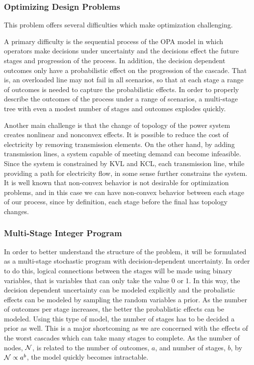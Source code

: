 \documentclass[class=report]{standalone}
\begin{document}
\subsubsection{Optimizing Design Problems}
This problem offers several difficulties which make optimization challenging.  

A primary difficulty is the sequential process of the OPA model in which operators make decisions under uncertainty and the decisions effect the future stages and progression of the process.  In addition, the decision dependent outcomes only have a probabilistic effect on the progression of the cascade.  That is, an overloaded line may not fail in all scenarios, so that at each stage a range of outcomes is needed to capture the probabilistic effects.  In order to properly describe the outcomes of the process under a range of scenarios, a multi-stage tree with even a modest number of stages and outcomes explodes quickly.

Another main challenge is that the change of topology of the power system creates nonlinear and nonconvex effects.  It is possible to reduce the cost of electricity by removing transmission elements.  On the other hand, by adding transmission lines, a system capable of meeting demand can become infeasible.  Since the system is constrained by KVL and KCL, each transmission line, while providing a path for electricity flow, in some sense further constrains the system.  It is well known that non-convex behavior is not desirable for optimization problems, and in this case we can have non-convex behavior between each stage of our process, since by definition, each stage before the final has topology changes.

\subsubsection{Multi-Stage Integer Program}
In order to better understand the structure of the problem, it will be formulated as a multi-stage stochastic program with decision-dependent uncertainty.  In order to do this, logical connections between the stages will be made using binary variables, that is variables that can only take the value 0 or 1.  In this way, the decision dependent uncertainty can be modeled explicitly and the probalistic effects can be modeled by sampling the random variables a prior.  As the number of outcomes per stage increases, the better the probablistic effects can be modeled.  Using this type of model, the number of stages has to be decided a prior as well.  This is a major shortcoming as we are concerned with the effects of the worst cascades which can take many stages to complete.  As the number of nodes, $\mathcal{N}$, is related to the number of outcomes, $a$, and number of stages, $b$, by $\mathcal{N} \propto a^{b}$, the model quickly becomes intractable. 
\end{document}
